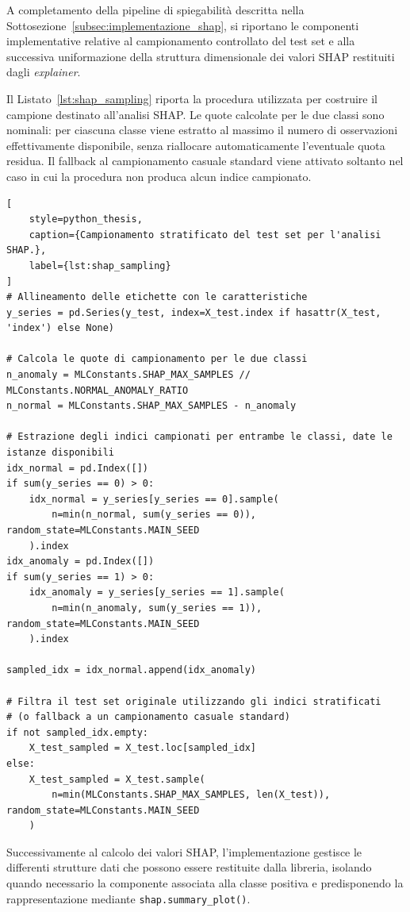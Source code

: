 A completamento della pipeline di spiegabilità descritta nella Sottosezione~\ref{subsec:implementazione_shap}, si riportano le componenti implementative relative al campionamento controllato del test set e alla successiva uniformazione della struttura dimensionale dei valori SHAP restituiti dagli \textit{explainer}.

Il Listato~\ref{lst:shap_sampling} riporta la procedura utilizzata per costruire il campione destinato all'analisi SHAP. Le quote calcolate per le due classi sono nominali: per ciascuna classe viene estratto al massimo il numero di osservazioni effettivamente disponibile, senza riallocare automaticamente l'eventuale quota residua. Il fallback al campionamento casuale standard viene attivato soltanto nel caso in cui la procedura non produca alcun indice campionato.

\begin{lstlisting}[
    style=python_thesis,
    caption={Campionamento stratificato del test set per l'analisi SHAP.},
    label={lst:shap_sampling}
]
# Allineamento delle etichette con le caratteristiche
y_series = pd.Series(y_test, index=X_test.index if hasattr(X_test, 'index') else None)

# Calcola le quote di campionamento per le due classi
n_anomaly = MLConstants.SHAP_MAX_SAMPLES // MLConstants.NORMAL_ANOMALY_RATIO
n_normal = MLConstants.SHAP_MAX_SAMPLES - n_anomaly

# Estrazione degli indici campionati per entrambe le classi, date le istanze disponibili
idx_normal = pd.Index([])
if sum(y_series == 0) > 0:
    idx_normal = y_series[y_series == 0].sample(
        n=min(n_normal, sum(y_series == 0)), random_state=MLConstants.MAIN_SEED
    ).index
idx_anomaly = pd.Index([])
if sum(y_series == 1) > 0:
    idx_anomaly = y_series[y_series == 1].sample(
        n=min(n_anomaly, sum(y_series == 1)), random_state=MLConstants.MAIN_SEED
    ).index

sampled_idx = idx_normal.append(idx_anomaly)

# Filtra il test set originale utilizzando gli indici stratificati
# (o fallback a un campionamento casuale standard)
if not sampled_idx.empty:
    X_test_sampled = X_test.loc[sampled_idx]
else:
    X_test_sampled = X_test.sample(
        n=min(MLConstants.SHAP_MAX_SAMPLES, len(X_test)), random_state=MLConstants.MAIN_SEED
    )
\end{lstlisting}

Successivamente al calcolo dei valori SHAP, l'implementazione gestisce le differenti strutture dati che possono essere restituite dalla libreria, isolando quando necessario la componente associata alla classe positiva e predisponendo la rappresentazione mediante \texttt{shap.summary\_plot()}.


